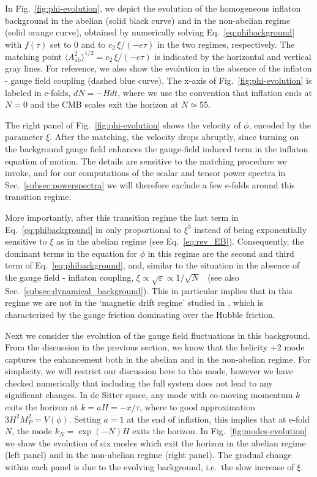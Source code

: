 In Fig.~\ref{fig:phi-evolution}, we depict the evolution of the homogeneous inflaton background in the abelian (solid black curve) and in the non-abelian regime (solid orange curve), obtained by numerically solving Eq.~\eqref{eq:phibackground} with $f(\tau)$ set to 0 and to $c_2 \, \xi/(- e \tau)$ in the two regimes, respectively. The matching point $\langle A^2_\text{ab} \rangle^{1/2} = c_2 \, \xi/(- e \tau)$ is indicated by the horizontal and vertical gray lines. For reference, we also show the evolution in the absence of the inflaton - gauge field coupling (dashed blue curve). The x-axis of Fig.~\ref{fig:phi-evolution} is labeled in e-folds, $dN = - H dt$, where we use the convention that inflation ends at $N = 0$ and the CMB scales exit the horizon at $N \simeq 55$.




{The right panel of Fig.~\ref{fig:phi-evolution} shows the velocity of $\phi$, encoded by the parameter $\xi$. After the matching, the velocity drops abruptly, since turning on the background gauge field enhances the gauge-field induced term in the inflaton equation of motion. {The details are sensitive to the matching procedure we invoke, and for our computations of the scalar and tensor power spectra in Sec.~\ref{subsec:powerspectra} we will therefore exclude a few e-folds around this transition regime.}

More importantly, after this transition regime the last term in Eq.~\eqref{eq:phibackground} in only proportional to $\xi^3$ instead of being  exponentially sensitive to $\xi$ as in the abelian regime (see Eq.~\eqref{eq:rev_EB}). Consequently, the dominant terms in the equation for $\phi$ in this regime are the second and third term of Eq.~\eqref{eq:phibackground}, and, similar to the situation in the absence of the gauge field - inflaton coupling, $\xi \propto \sqrt{\varepsilon} \propto 1/\sqrt{N}$~\cite{Domcke:2016bkh} (see also Sec.~\ref{subsec:dynamical_background}). This in particular implies that in this regime we are not in the `magnetic drift regime' studied in \cite{Adshead:2013nka}, which is characterized by the gauge friction dominating over the Hubble friction. }




Next we consider the evolution of the gauge field fluctuations in this background. From the discussion in the previous section, we know that the helicity $+2$ mode captures the enhancement both in the abelian and in the non-abelian regime. For simplicity, we will restrict our discussion here to this mode, however we have checked numerically that including the full system does not lead to any significant changes. In de Sitter space, any mode with co-moving momentum $k$ exits the horizon at $k = a H = - x/\tau$, where to good approximation $3 H^2 M_P^2 = V(\phi)$. Setting $a = 1$ at the end of inflation, this implies that at e-fold $N$, the mode $k_N = \exp(-N) H$ exits the horizon. In Fig.~\ref{fig:modes-evolution} we show the evolution of six modes which exit the horizon in the abelian regime (left panel) and in the non-abelian regime (right panel). The gradual change within each panel is due to the evolving background, i.e.\ the slow increase of $\xi$.

